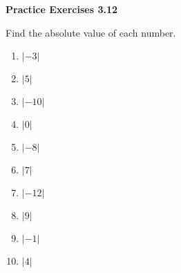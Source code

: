 \vspace{0.3ex}
\noindent\textbf{Practice Exercises 3.12}

\vspace{0.2ex}

Find the absolute value of each number.
\begin{multicols}{3}
\begin{enumerate}[noitemsep, label = \color{blue}\arabic*. ]
    \item \(|-3|\)
    \item \(|5|\)
    \item \(|-10|\)
    \item \(|0|\)
    \item \(|-8|\)
    \item \(|7|\)
    \item \(|-12|\)
    \item \(|9|\)
    \item \(|-1|\)
    \item \(|4|\)
\end{enumerate}
\end{multicols}
